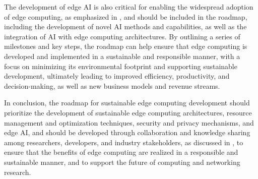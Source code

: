 \documentclass[11pt]{article}
\begin{document}
The development of edge AI is also critical for enabling the widespread adoption of edge computing, as emphasized in \cite{ref195}, and should be included in the roadmap, including the development of novel AI methods and capabilities, as well as the integration of AI with edge computing architectures. By outlining a series of milestones and key steps, the roadmap can help ensure that edge computing is developed and implemented in a sustainable and responsible manner, with a focus on minimizing its environmental footprint and supporting sustainable development, ultimately leading to improved efficiency, productivity, and decision-making, as well as new business models and revenue streams.

In conclusion, the roadmap for sustainable edge computing development should prioritize the development of sustainable edge computing architectures, resource management and optimization techniques, security and privacy mechanisms, and edge AI, and should be developed through collaboration and knowledge sharing among researchers, developers, and industry stakeholders, as discussed in \cite{ref219}, to ensure that the benefits of edge computing are realized in a responsible and sustainable manner, and to support the future of computing and networking research.
\end{document}
